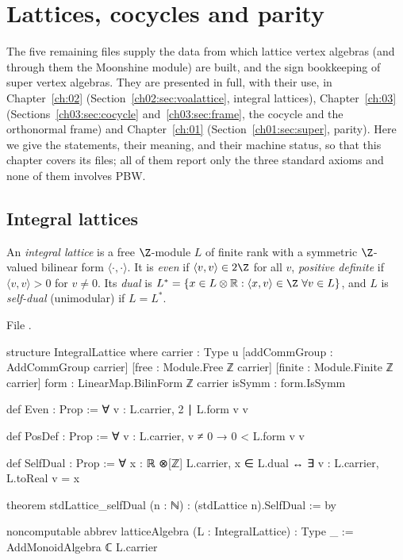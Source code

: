 \section{Lattices, cocycles and parity}\label{l02:sec:lattices}

The five remaining files supply the data from which lattice vertex algebras (and through them the
Moonshine module) are built, and the sign bookkeeping of super vertex algebras. They are presented in
full, with their use, in Chapter~\ref{ch:02} (Section~\ref{ch02:sec:voalattice}, integral lattices),
Chapter~\ref{ch:03} (Sections~\ref{ch03:sec:cocycle} and~\ref{ch03:sec:frame}, the cocycle and the
orthonormal frame) and Chapter~\ref{ch:01} (Section~\ref{ch01:sec:super}, parity). Here we give the
statements, their meaning, and their machine status, so that this chapter covers its files; all of them
report only the three standard axioms and none of them involves PBW.

\subsection{Integral lattices}

\begin{definition}\label{l02:def:lattice}
An \emph{integral lattice} is a free $\Z$-module $L$ of finite rank with a symmetric $\Z$-valued
bilinear form $\langle\cdot,\cdot\rangle$. It is \emph{even} if $\langle v,v\rangle\in2\Z$ for all $v$,
\emph{positive definite} if $\langle v,v\rangle>0$ for $v\ne0$. Its \emph{dual} is
$L^* = \{x\in L\otimes\mathbb{R} : \langle x,v\rangle\in\Z\ \forall v\in L\}$, and $L$ is
\emph{self-dual} (unimodular) if $L = L^*$.
\end{definition}

File .
\begin{leancode}
structure IntegralLattice where
  carrier : Type u
  [addCommGroup : AddCommGroup carrier]
  [free : Module.Free ℤ carrier]
  [finite : Module.Finite ℤ carrier]
  form : LinearMap.BilinForm ℤ carrier
  isSymm : form.IsSymm

def Even : Prop := ∀ v : L.carrier, 2 ∣ L.form v v

def PosDef : Prop := ∀ v : L.carrier, v ≠ 0 → 0 < L.form v v

def SelfDual : Prop := ∀ x : ℝ ⊗[ℤ] L.carrier, x ∈ L.dual ↔ ∃ v : L.carrier, L.toReal v = x

theorem stdLattice_selfDual (n : ℕ) : (stdLattice n).SelfDual := by

noncomputable abbrev latticeAlgebra (L : IntegralLattice) : Type _ :=
  AddMonoidAlgebra ℂ L.carrier
\end{leancode}

